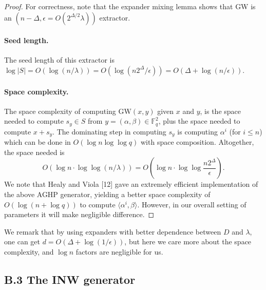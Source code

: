 \documentclass[10pt,a4paper]{article}
\begin{document}
\begin{proof}
For correctness, note that the expander mixing lemma shows that GW is an $(n-\Delta,\epsilon=O(2^{\Delta/2}\lambda))$ extractor.
\paragraph{Seed length.} The seed length of this extractor is $\log|S|=O(\log(n/\lambda))=O(\log(n2^\Delta/\epsilon))=O(\Delta+\log(n/\epsilon))$.
\paragraph{Space complexity.} The space complexity of computing $\mathrm{GW}(x,y)$ given $x$ and $y$, is the space needed to compute $s_y\in S$ from $y=(\alpha,\beta)\in\mathbb F_q^2$, plus the space needed to compute $x+s_y$. The dominating step in computing $s_y$ is computing $\alpha^i$ (for $i\le n$) which can be done in $O(\log n\log\log q)$ with space composition. Altogether, the space needed is
\[O(\log n\cdot\log\log(n/\lambda))=O\left(\log n\cdot\log\log\frac{n2^\Delta}\epsilon\right).\]
We note that Healy and Viola [12] gave an extremely efficient implementation of the above AGHP generator, yielding a better space complexity of $O(\log(n+\log q))$ to compute $\langle\alpha^i,\beta\rangle$. However, in our overall setting of parameters it will make negligible difference.
\end{proof}
We remark that by using expanders with better dependence between $D$ and $\lambda$, one can get $d=O(\Delta+\log(1/\epsilon))$, but here we care more about the space complexity, and $\log n$ factors are negligible for us.
\subsection*{B.3 The INW generator}
\end{document}
